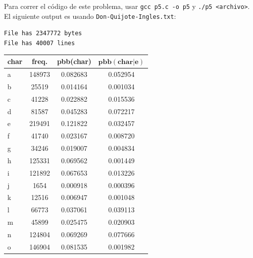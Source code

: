 \documentclass{article}
\theoremstyle{problemstyle}
\begin{document}
\begin{problem}
\begin{enumerate}[a.]
    Para correr el c\'odigo de este problema, usar \texttt{gcc p5.c -o p5} y \texttt{./p5 <archivo>}. El siguiente output es usando \texttt{Don-Quijote-Ingles.txt}:
\begin{center}
  \texttt{File has 2347772 bytes}\\
  \texttt{File has 40007 lines}
\end{center}
	      \begin{table}[H]
		      \centering
		      \begin{tabular}{|l|c|c|c|}
			      \hline
			      \textbf{char} & \textbf{freq.} & \textbf{pbb(char)} & $\mathbf{pbb(char|e)}$ \\
			      \hline
			      a             & 148973         & 0.082683           & 0.052954               \\
			      b             & 25519          & 0.014164           & 0.001034               \\
			      c             & 41228          & 0.022882           & 0.015536               \\
			      d             & 81587          & 0.045283           & 0.072217               \\
			      e             & 219491         & 0.121822           & 0.032457               \\
			      f             & 41740          & 0.023167           & 0.008720               \\
			      g             & 34246          & 0.019007           & 0.004834               \\
			      h             & 125331         & 0.069562           & 0.001449               \\
			      i             & 121892         & 0.067653           & 0.013226               \\
			      j             & 1654           & 0.000918           & 0.000396               \\
			      k             & 12516          & 0.006947           & 0.001048               \\
			      l             & 66773          & 0.037061           & 0.039113               \\
			      m             & 45899          & 0.025475           & 0.020903               \\
			      n             & 124804         & 0.069269           & 0.077666               \\
			      o             & 146904         & 0.081535           & 0.001982               \\

\end{tabular}
\end{table}
\end{enumerate}
\end{problem}
\end{document}
